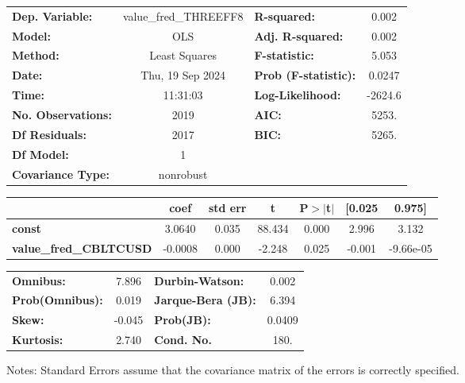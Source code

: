 \begin{center}
\begin{tabular}{lclc}
\toprule
\textbf{Dep. Variable:}        & value\_fred\_THREEFF8 & \textbf{  R-squared:         } &     0.002   \\
\textbf{Model:}                &          OLS          & \textbf{  Adj. R-squared:    } &     0.002   \\
\textbf{Method:}               &     Least Squares     & \textbf{  F-statistic:       } &     5.053   \\
\textbf{Date:}                 &    Thu, 19 Sep 2024   & \textbf{  Prob (F-statistic):} &   0.0247    \\
\textbf{Time:}                 &        11:31:03       & \textbf{  Log-Likelihood:    } &   -2624.6   \\
\textbf{No. Observations:}     &           2019        & \textbf{  AIC:               } &     5253.   \\
\textbf{Df Residuals:}         &           2017        & \textbf{  BIC:               } &     5265.   \\
\textbf{Df Model:}             &              1        & \textbf{                     } &             \\
\textbf{Covariance Type:}      &       nonrobust       & \textbf{                     } &             \\
\bottomrule
\end{tabular}
\begin{tabular}{lcccccc}
                               & \textbf{coef} & \textbf{std err} & \textbf{t} & \textbf{P$> |$t$|$} & \textbf{[0.025} & \textbf{0.975]}  \\
\midrule
\textbf{const}                 &       3.0640  &        0.035     &    88.434  &         0.000        &        2.996    &        3.132     \\
\textbf{value\_fred\_CBLTCUSD} &      -0.0008  &        0.000     &    -2.248  &         0.025        &       -0.001    &    -9.66e-05     \\
\bottomrule
\end{tabular}
\begin{tabular}{lclc}
\textbf{Omnibus:}       &  7.896 & \textbf{  Durbin-Watson:     } &    0.002  \\
\textbf{Prob(Omnibus):} &  0.019 & \textbf{  Jarque-Bera (JB):  } &    6.394  \\
\textbf{Skew:}          & -0.045 & \textbf{  Prob(JB):          } &   0.0409  \\
\textbf{Kurtosis:}      &  2.740 & \textbf{  Cond. No.          } &     180.  \\
\bottomrule
\end{tabular}
\end{center}

Notes: \newline
 [1] Standard Errors assume that the covariance matrix of the errors is correctly specified.